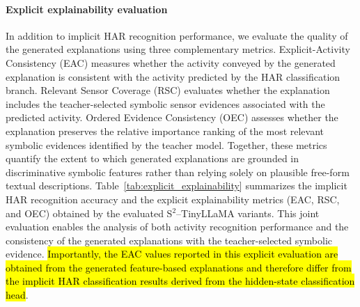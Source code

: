 \documentclass[preprint,12pt]{elsarticle}
\begin{document}
\paragraph{Explicit explainability evaluation}
In addition to implicit HAR recognition performance, we evaluate the quality of the generated explanations using three complementary metrics. Explicit-Activity Consistency (EAC) measures whether the activity conveyed by the generated explanation is consistent with the activity predicted by the HAR classification branch. Relevant Sensor Coverage (RSC) evaluates whether the explanation includes the teacher-selected symbolic sensor evidences associated with the predicted activity. Ordered Evidence Consistency (OEC) assesses whether the explanation preserves the relative importance ranking of the most relevant symbolic evidences identified by the teacher model. Together, these metrics quantify the extent to which generated explanations are grounded in discriminative symbolic features rather than relying solely on plausible free-form textual descriptions. Table~\ref{tab:explicit_explainability} summarizes the implicit HAR recognition accuracy and the explicit explainability metrics (EAC, RSC, and OEC) obtained by the evaluated S$^{2}$--TinyLLaMA variants. This joint evaluation enables the analysis of both activity recognition performance and the consistency of the generated explanations with the teacher-selected symbolic evidence. \hl{Importantly, the EAC values reported in this explicit evaluation are obtained from the generated feature-based explanations and therefore differ from the implicit HAR classification results derived from the hidden-state classification head}.
\end{document}
